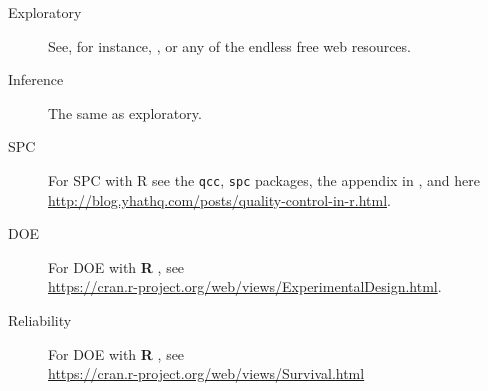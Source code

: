 \documentclass[12pt,a4paper]{report}
\theoremstyle{plain}
\theoremstyle{definition}
\newcommand{\R}{\textnormal{\sffamily\bfseries R }}
\newcommand{\rcode}[1]{\texttt{#1}}
\begin{document}
\begin{description}
\item [Exploratory] See, for instance, \cite{venables_modern_2002}, or any of the endless free web resources. 
\item [Inference] The same as exploratory.
\item [SPC] For SPC with R see the \rcode{qcc}, \rcode{spc} packages, the appendix in \cite{qiu_introduction_2013}, and here \\ \url{http://blog.yhathq.com/posts/quality-control-in-r.html}.
\item [DOE] For DOE with \R, see \\ \url{https://cran.r-project.org/web/views/ExperimentalDesign.html}.
\item [Reliability] For DOE with \R, see \\ \url{https://cran.r-project.org/web/views/Survival.html}
\end{description}


 


\newpage
{}


\label{sec:bibliography}
\end{document}
